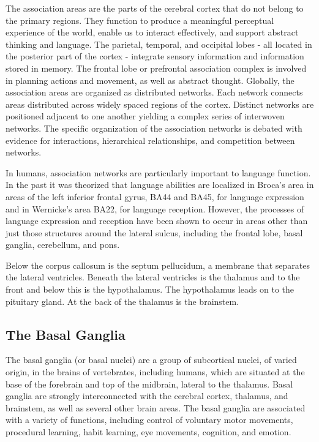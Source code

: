 The association areas are the parts of the cerebral cortex that do not belong to the primary regions. They function to produce a meaningful perceptual experience of the world, enable us to interact effectively, and support abstract thinking and language. The parietal, temporal, and occipital lobes - all located in the posterior part of the cortex - integrate sensory information and information stored in memory. The frontal lobe or prefrontal association complex is involved in planning actions and movement, as well as abstract thought. Globally, the association areas are organized as distributed networks. Each network connects areas distributed across widely spaced regions of the cortex. Distinct networks are positioned adjacent to one another yielding a complex series of interwoven networks. The specific organization of the association networks is debated with evidence for interactions, hierarchical relationships, and competition between networks.

In humans, association networks are particularly important to language function. In the past it was theorized that language abilities are localized in Broca's area in areas of the left inferior frontal gyrus, BA44 and BA45, for language expression and in Wernicke's area BA22, for language reception. However, the processes of language expression and reception have been shown to occur in areas other than just those structures around the lateral sulcus, including the frontal lobe, basal ganglia, cerebellum, and pons.

Below the corpus callosum is the septum pellucidum, a membrane that separates the lateral ventricles. Beneath the lateral ventricles is the thalamus and to the front and below this is the hypothalamus. The hypothalamus leads on to the pituitary gland. At the back of the thalamus is the brainstem.

\hypertarget{the-basal-ganglia}{%
\subsection{The Basal Ganglia}\label{the-basal-ganglia}}

The basal ganglia (or basal nuclei) are a group of subcortical nuclei, of varied origin, in the brains of vertebrates, including humans, which are situated at the base of the forebrain and top of the midbrain, lateral to the thalamus. Basal ganglia are strongly interconnected with the cerebral cortex, thalamus, and brainstem, as well as several other brain areas. The basal ganglia are associated with a variety of functions, including control of voluntary motor movements, procedural learning, habit learning, eye movements, cognition, and emotion.

